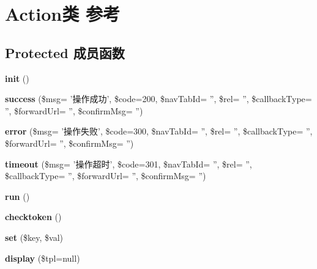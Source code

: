 \hypertarget{classAction}{\section{Action类 参考}
\label{classAction}
}
\subsection*{Protected 成员函数}
\begin{DoxyCompactItemize}
\item 
\hypertarget{classAction_a36e0fbe39840e8713aa5e57c6ec77525}{{\bfseries init} ()}\label{classAction_a36e0fbe39840e8713aa5e57c6ec77525}

\item 
\hypertarget{classAction_a89048985af4d911c73c9b3582eaac0db}{{\bfseries success} (\$msg= '操作成功', \$code=200, \$nav\+Tab\+Id= '', \$rel= '', \$callback\+Type= '', \$forward\+Url= '', \$confirm\+Msg= '')}\label{classAction_a89048985af4d911c73c9b3582eaac0db}

\item 
\hypertarget{classAction_add0871e8a54f41233a4a442a18eed77f}{{\bfseries error} (\$msg= '操作失败', \$code=300, \$nav\+Tab\+Id= '', \$rel= '', \$callback\+Type= '', \$forward\+Url= '', \$confirm\+Msg= '')}\label{classAction_add0871e8a54f41233a4a442a18eed77f}

\item 
\hypertarget{classAction_a70704095c8d66340022d227d99470649}{{\bfseries timeout} (\$msg= '操作超时', \$code=301, \$nav\+Tab\+Id= '', \$rel= '', \$callback\+Type= '', \$forward\+Url= '', \$confirm\+Msg= '')}\label{classAction_a70704095c8d66340022d227d99470649}

\item 
\hypertarget{classAction_a3a56b1c959956b671038c1f8bcd6dfb4}{{\bfseries run} ()}\label{classAction_a3a56b1c959956b671038c1f8bcd6dfb4}

\item 
\hypertarget{classAction_a393ee8679b3bdf2db1571882247e2686}{{\bfseries checktoken} ()}\label{classAction_a393ee8679b3bdf2db1571882247e2686}

\item 
\hypertarget{classAction_a14514e26573354d09824c35251155d88}{{\bfseries set} (\$key, \$val)}\label{classAction_a14514e26573354d09824c35251155d88}

\item 
\hypertarget{classAction_ab80a2d32134ea0e91f516c74a0eae0f3}{{\bfseries display} (\$tpl=null)}\label{classAction_ab80a2d32134ea0e91f516c74a0eae0f3}

\end{DoxyCompactItemize}

